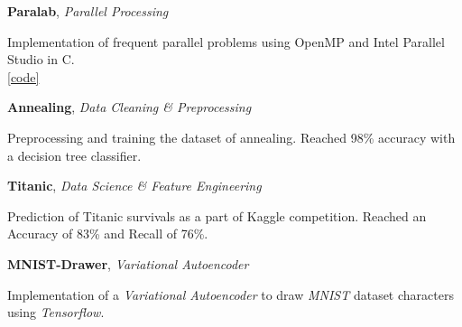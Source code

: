 \documentclass[margin, 10pt]{res} %
\begin{document}
\textbf{Paralab}, 
\textit{Parallel Processing}
\begin{innerlist}
	\item Implementation of frequent parallel problems using OpenMP and Intel Parallel Studio in C.\\ \phantom{km}
	\hfill{\UrlFont\href{https://github.com/aligholamee/ParaLab/tree/master}{[code]}}
\end{innerlist}

\textbf{Annealing}, 
\textit{Data Cleaning \& Preprocessing}
\begin{innerlist}
	\item Preprocessing and training the dataset of annealing. Reached 98\% accuracy with a decision tree classifier.\\ \phantom{km}
	\hfill{}
\end{innerlist}

\textbf{Titanic}, 
\textit{Data Science \& Feature Engineering}
\begin{innerlist}
	\item Prediction of Titanic survivals as a part of Kaggle competition. Reached an\\ Accuracy of 83\% and Recall of 76\%. \href{https://github.com/aligholamee/Titanic}{\hfill{\UrlFont[code]}}
\end{innerlist}

\textbf{MNIST-Drawer}, 
\textit{Variational Autoencoder}
\begin{innerlist}
	\item Implementation of a \textit{Variational Autoencoder} to draw \textit{MNIST} dataset characters\\ using \textit{Tensorflow}. \href{https://github.com/aligholamee/MNIST-Drawer}{\hfill{\UrlFont[code]}}
\end{innerlist}
\end{document}
